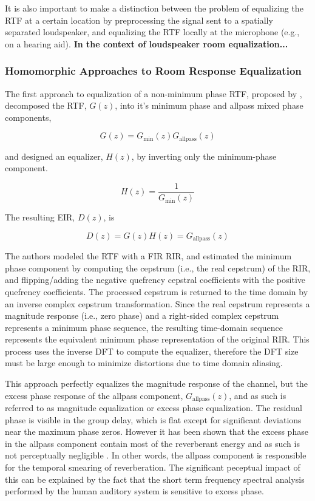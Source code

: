 It is also important to make a distinction between the problem of equalizing the RTF at a certain location by preprocessing the signal sent to a spatially separated loudspeaker, and equalizing the RTF locally at the microphone (e.g., on a hearing aid). \textbf{In the context of loudspeaker room equalization...}

\subsubsection{Homomorphic Approaches to Room Response Equalization} \label{homomorphic_eq}

The first approach to equalization of a non-minimum phase RTF, proposed by \cite{neely1979invertibility}, decomposed the RTF, $G(z)$, into it's minimum phase and allpass mixed phase components, 

\begin{equation}
	G(z)=G_{\mathrm{min}}(z)G_{\mathrm{allpass}}(z)
\end{equation}

\noindent
and designed an equalizer, $H(z)$, by inverting only the minimum-phase component. 

\begin{equation}
	H(z)=\frac{1}{G_{\mathrm{min}}(z)}
\end{equation}

\noindent
The resulting EIR, $D(z)$, is

\begin{equation}
	D(z)=G(z)H(z)=G_{\mathrm{allpass}}(z)
\end{equation}

The authors modeled the RTF with a FIR RIR, and estimated the minimum phase component by computing the cepstrum (i.e., the real cepstrum) of the RIR, and flipping/adding the negative quefrency cepstral coefficients with the positive quefrency coefficients. The processed cepstrum is returned to the time domain by an inverse complex cepstrum transformation. Since the real cepstrum represents a magnitude response (i.e., zero phase) and a right-sided complex cepstrum represents a minimum phase sequence, the resulting time-domain sequence represents the equivalent minimum phase representation of the original RIR. This process uses the inverse DFT to compute the equalizer, therefore the DFT size must be large enough to minimize distortions due to time domain aliasing. 

This approach perfectly equalizes the magnitude response of the channel, but the excess phase response of the allpass component, $G_{\mathrm{allpass}}(z)$,  and as such is referred to as magnitude equalization or excess phase equalization. The residual phase is visible in the group delay, which is flat except for significant deviations near the maximum phase zeros. However it has been shown that the excess phase in the allpass component contain most of the reverberant energy and as such is not perceptually negligible \citep{johansen1996excess}. In other words, the allpass component is responsible for the temporal smearing of reverberation. The significant peceptual impact of this can be explained by the fact that the short term frequency spectral analysis performed by the human auditory system is sensitive to excess phase.

